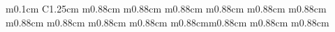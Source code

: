 \begin{ThreePartTable}
{\begin{longtable}{m{0.1cm} C{1.25cm} m{0.88cm} m{0.88cm} m{0.88cm} m{0.88cm} m{0.88cm} m{0.88cm} m{0.88cm} m{0.88cm} m{0.88cm} m{0.88cm} m{0.88cm}m{0.88cm} m{0.88cm} m{0.88cm}}
\toprule

\end{longtable}}
\end{ThreePartTable}

